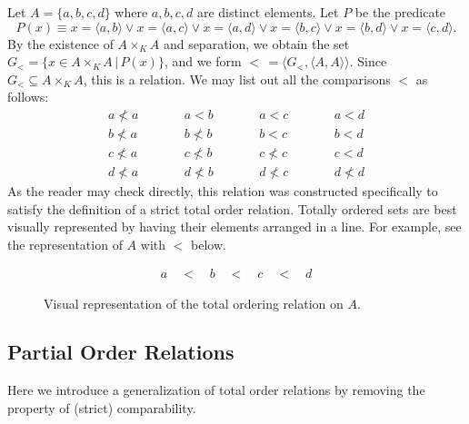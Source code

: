 \begin{example}\label{ch1ex_rel_totalorder}
	Let $A = \{a, b, c, d\}$ where $a, b, c, d$ are distinct elements. 
	Let $P$ be the predicate
	\[ P(x)\equiv x = \langle a, b\rangle \lor x = \langle a, c\rangle \lor x = \langle a, d\rangle \lor x = \langle b, c\rangle \lor x = \langle b, d\rangle \lor x = \langle c, d\rangle. \]
	By the existence of $A\times_{K} A$ and separation, we obtain the set $G_{<} = \{x\in A\times_{K} A \,|\, P(x)\}$, and we form $<\, = \langle G_{<}, \langle A, A\rangle\rangle$.
	Since $G_{<}\subseteq A\times_{K} A$, this is a relation.
	We may list out all the comparisons $<$ as follows:
	\begin{align*}
		a \not< a &\qquad & a < b     &\qquad & a < c     &\qquad & a < d \\[4pt]
		b \not< a &\qquad & b \not< b &\qquad & b < c     &\qquad & b < d \\[4pt]
		c \not< a &\qquad & c \not< b &\qquad & c \not< c &\qquad & c < d \\[4pt]
		d \not< a &\qquad & d \not< b &\qquad & d \not< c &\qquad & d \not< d
	\end{align*}
	As the reader may check directly, this relation was constructed specifically to satisfy the definition of a strict total order relation. 
	Totally ordered sets are best visually represented by having their elements arranged in a line.
	For example, see the representation of $A$ with $<$ below.
	\begin{figure}[H]
		\centering
		\begin{align*}
			a\quad <\quad b\quad <\quad c\quad <\quad d
		\end{align*}
		\caption{Visual representation of the total ordering relation on $A$.}
	\end{figure}
\end{example}

\subsection{Partial Order Relations}

Here we introduce a generalization of total order relations by removing the property of (strict) comparability. 

